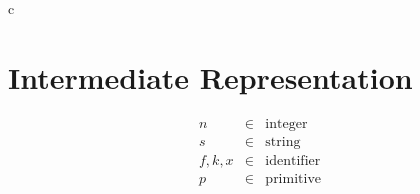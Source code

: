 \documentclass[11pt]{article}
\newcommand{\kw}[1]{\mathtt{#1}}
\begin{document}
\begin{rules}{c}


\end{rules}

\newpage

\section{Intermediate Representation}

\newcommand{\appc}[2]{#1\;#2}
\newcommand{\appf}[3]{#1\;#2\;#3}
\newcommand{\letc}[4]{\kw{letc}\;#1\;#2 = #3\;\kw{in}\;#4}

\newcommand{\defterm}[4]{#1\;#2\;#3 = #4}
\newcommand{\letf}[2]{\kw{letf}\;\repo{#1}\;\kw{in}\;#2}
\newcommand{\letff}[2]{\kw{letf}\;#1\;\kw{in}\;#2}

\newcommand{\letv}[3]{\kw{letv}\;#1 = #2\;\kw{in}\;#3}

\newcommand{\casv}[3]{\kw{case}\;#1\;\repo{(#2\;#3)}}
\newcommand{\funv}[3]{\kw{fun}\;#1\;#2\;.\;#3}
\newcommand{\intv}[1]{#1}
\newcommand{\prmv}[2]{#1(#2)}
\newcommand{\recv}[2]{\{ \repo{#1 = #2} \}}
\newcommand{\recvs}[2]{\{ #1 \}}
\newcommand{\strv}[1]{#1}
\newcommand{\varv}[2]{<\!#1\!>}

\newcommand{\andv}[2]{\kw{concat}\;#1\;#2}
\newcommand{\argv}[1]{\kw{argument}\;#1}
\newcommand{\capv}[2]{\kw{capability}\;#1\;#2}
\newcommand{\selv}[2]{\kw{select}\;#1\;#2}

\[
\begin{array}{lcl}
n       & \in & \text{integer} \\
s       & \in & \text{string} \\
f, k, x & \in & \text{identifier} \\
p       & \in & \text{primitive} \\
\end{array}
\]
\end{document}
